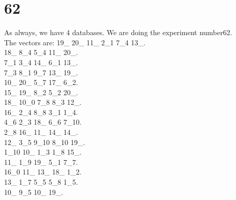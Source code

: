 \chapter{62}
\indent As always, we have 4 databases. We are doing the experiment number62.\\
The vectors are:
19\_ 20\_ 11\_ 2\_1 7\_4 13\_.\\18\_ 8\_4 5\_4 11\_ 20\_.\\7\_1 3\_4 14\_ 6\_1 13\_.\\7\_3 8\_1 9\_7 13\_ 19\_.\\10\_ 20\_ 5\_7 17\_ 6\_2.\\15\_ 19\_ 8\_2 5\_2 20\_.\\18\_ 10\_0 7\_8 8\_3 12\_.\\16\_ 2\_4 8\_8 3\_1 1\_4.\\4\_6 2\_3 18\_ 6\_6 7\_10.\\2\_8 16\_ 11\_ 14\_ 14\_.\\12\_ 3\_5 9\_10 8\_10 19\_.\\1\_10 10\_ 1\_3 1\_8 15\_.\\11\_ 1\_9 19\_ 5\_1 7\_7.\\16\_0 11\_ 13\_ 18\_ 1\_2.\\13\_ 1\_7 5\_5 5\_8 1\_5.\\10\_ 9\_5 10\_ 19\_.\\